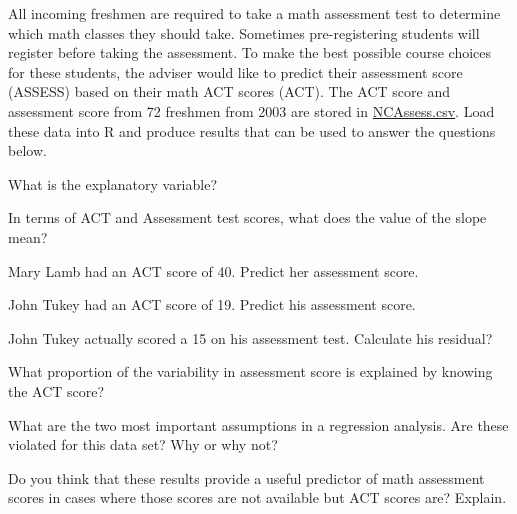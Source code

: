 \documentclass[10pt,openany]{book}\usepackage[]{graphicx}\usepackage[]{color}
\begin{document}
\begin{exsection}
  \item \label{revex:RegMathAss} \rhw{} All incoming freshmen are required to take a math assessment test to determine which math classes they should take. Sometimes pre-registering students will register before taking the assessment.  To make the best possible course choices for these students, the adviser would like to predict their assessment score (ASSESS) based on their math ACT scores (ACT). The ACT score and assessment score from 72 freshmen from 2003 are stored in \href{https://raw.githubusercontent.com/droglenc/NCData/master/NCAssess.csv}{NCAssess.csv}.  Load these data into R and produce results that can be used to answer the questions below. 
    \begin{Enumerate}
      \item What is the explanatory variable?
      \item In terms of ACT and Assessment test scores, what does the value of the slope mean?
      \item Mary Lamb had an ACT score of 40.  Predict her assessment score.
      \item John Tukey had an ACT score of 19.  Predict his assessment score.
      \item John Tukey actually scored a 15 on his assessment test.  Calculate his residual?
      \item What proportion of the variability in assessment score is explained by knowing the ACT score?
      \item What are the two most important assumptions in a regression analysis.  Are these violated for this data set?  Why or why not?
      \item Do you think that these results provide a useful predictor of math assessment scores in cases where those scores are not available but ACT scores are? Explain.
    \end{Enumerate}


\end{exsection}
\end{document}
